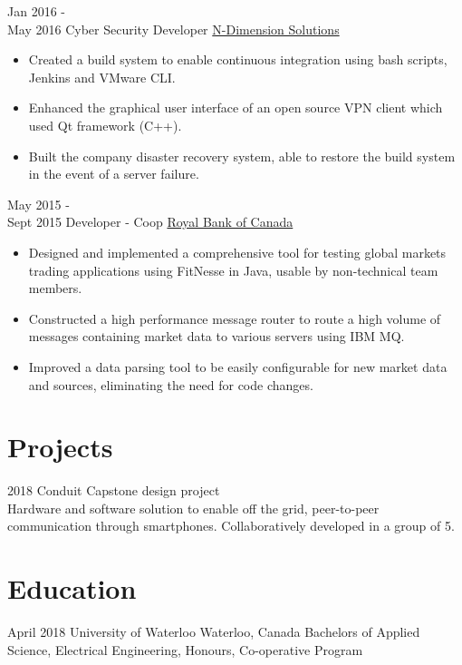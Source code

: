 \documentclass[letterpaper]{twentysecondcv} %
\begin{document}
\begin{twenty}
    \twentyitem
   		{Jan 2016 - \\ May 2016}
        {Cyber Security Developer}
        {\href{https://www.n-dimension.com}{N-Dimension Solutions}}
        {}
        {
        {\begin{itemize}
        \item Created a build system to enable continuous integration using bash scripts, Jenkins and VMware CLI.
        \item Enhanced the graphical user interface of an open source VPN client which used Qt framework (C++).
        \item Built the company disaster recovery system, able to restore the build system in the event of a server failure.
    \end{itemize}}
        }
        
     \twentyitem
   		{May 2015 - \\ Sept 2015}
        {Developer - Coop}
        {\href{https://www.rbcwealthmanagement.com}{Royal Bank of Canada}}
        {}
        {
        \begin{itemize}
        \item Designed and implemented a comprehensive tool for testing global markets trading applications using FitNesse in Java, usable by non-technical team members.
        \item Constructed a high performance message router to route a high volume of messages containing market data to various servers using IBM MQ.
        \item Improved a data parsing tool to be easily configurable for new market data and sources, eliminating the need for code changes.
    \end{itemize}
    	}
\end{twenty}

\section{Projects}
\begin{twenty}
\twentyitem
   		{2018}
        {Conduit}
        {Capstone design project}
        {}
        {
        \\
        Hardware and software solution to enable off the grid, peer-to-peer communication through smartphones. Collaboratively developed in a group of 5. 
        }
\end{twenty}

\section{Education}
\begin{twenty}
\twentyitem
   		{April 2018}
        {University of Waterloo}
        {Waterloo, Canada}
        {}
        {
        Bachelors of Applied Science, Electrical Engineering, Honours, Co-operative Program
        }
\end{twenty}
\end{document}
